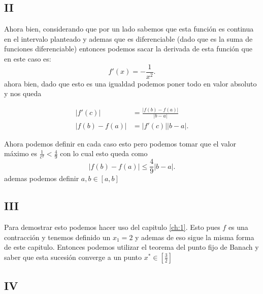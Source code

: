 \documentclass{report}
\begin{document}
\subsection{II}

Ahora bien, considerando que por un lado sabemos que esta función es continua en el intervalo planteado y ademas que es diferenciable (dado que es la suma de funciones diferenciable) entonces podemos sacar la derivada de esta función que en este caso es: \[
f'\left( x \right) = - \frac{1}{x^2}
.\] ahora bien, dado que esto es una igualdad podemos poner todo en valor absoluto y nos queda

\begin{align*}
  \left| f'\left( c \right)  \right| &= \frac{\left| f\left( b \right) - f\left( a \right)  \right| }{\left| b - a \right| }\\
  \left| f\left( b \right) - f\left( a \right)  \right| &= \left| f'\left( c \right)  \right| \left| b - a \right|
.\end{align*}

Ahora podemos definir en cada caso esto pero podemos tomar que el valor máximo es $\frac{1}{c^2} < \frac{4}{9}$ con lo cual esto queda como \[
  \left| f\left( b \right) - f\left( a \right)  \right| \le \frac{4}{9}\left| b - a \right| 
.\] ademas podemos definir $a, b \in \left[ a, b \right] $ 

\subsection{III}

Para demostrar esto podemos hacer uso del capitulo \ref{ch:1}. Esto pues $f$ es una contracción y tenemos definido un $x_1 = 2$ y ademas de eso sigue la misma forma de este capitulo. Entonces podemos utilizar el teorema del punto fijo de Banach y saber que esta sucesión converge a un punto $x^{*} \in \left[ \frac{3}{2} \right] $

\subsection{IV}
\end{document}
